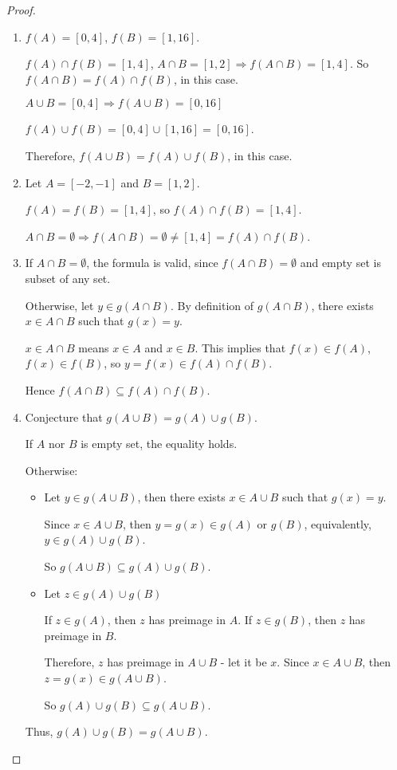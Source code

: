 \documentclass[class=understanding-analysis,crop=false]{standalone}
\begin{document}
\begin{proof}
    \begin{enumerate}[label = (\alph*)]
        \item $f(A) = [0, 4]$, $f(B) = [1, 16]$.
            \par $f(A)\cap f(B) = [1, 4]$, $A\cap B = [1, 2]\Rightarrow f(A\cap B) = [1, 4]$. So $f(A\cap B) = f(A)\cap f(B)$, in this case.
            \par $A\cup B = [0, 4]\Rightarrow f(A\cup B) = [0, 16]$
            \par $f(A)\cup f(B) = [0, 4]\cup [1, 16] = [0, 16]$.
            \par Therefore, $f(A\cup B) = f(A)\cup f(B)$, in this case.
        \item Let $A = [-2, -1]$ and $B = [1, 2]$.
            \par $f(A) = f(B) = [1, 4]$, so $f(A)\cap f(B) = [1, 4]$.
            \par $A\cap B = \emptyset\Rightarrow f(A\cap B) = \emptyset\ne [1, 4] = f(A)\cap f(B)$.
        \item If $A\cap B = \emptyset$, the formula is valid, since $f(A\cap B) = \emptyset$ and empty set is subset of any set.
            \par Otherwise, let $y\in g(A\cap B)$. By definition of $g(A\cap B)$, there exists $x\in A\cap B$ such that $g(x) = y$.
            \par $x\in A\cap B$ means $x\in A$ and $x\in B$. This implies that $f(x)\in f(A)$, $f(x)\in f(B)$, so $y = f(x) \in f(A)\cap f(B)$.
            \par Hence $f(A\cap B)\subseteq f(A)\cap f(B)$.
        \item Conjecture that $g(A\cup B) = g(A)\cup g(B)$.
            \par If $A$ nor $B$ is empty set, the equality holds.
            \par Otherwise:
            \begin{itemize}
                \item Let $y\in g(A\cup B)$, then there exists $x\in A\cup B$ such that $g(x) = y$.
                    \par Since $x\in A\cup B$, then $y = g(x) \in g(A)$ or $g(B)$, equivalently, $y\in g(A)\cup g(B)$.
                    \par So $g(A\cup B)\subseteq g(A)\cup g(B)$.
                \item Let $z\in g(A)\cup g(B)$
                    \par If $z\in g(A)$, then $z$ has preimage in $A$. If $z\in g(B)$, then $z$ has preimage in $B$.
                    \par Therefore, $z$ has preimage in $A\cup B$ - let it be $x$. Since $x\in A\cup B$, then $z = g(x)\in g(A\cup B)$.
                    \par So $g(A)\cup g(B)\subseteq g(A\cup B)$.
            \end{itemize}
            \par Thus, $g(A)\cup g(B) = g(A\cup B)$.
    \end{enumerate}
\end{proof}
\end{document}

